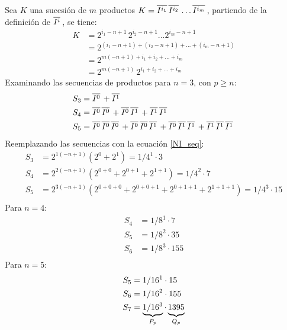 Sea $K$ una sucesión de $m$ productos $K = \overline{I^{i_1}}\, \overline{I^{i_2}}\, \ldots \overline{I^{i_m}}\,$, 
partiendo de la definición de $\overline{I^{i}}\,$, se tiene:
%
\begin{equation}
\label{NI_seq}
\begin{split}
	K &= 2^{i_1-n+1} \, 2^{i_2-n+1} \ldots 2^{i_m-n+1} \\
		&= 2^{(i_1-n+1) + (i_2-n+1) + \ldots + (i_m-n+1)} \\
		&= 2^{m(-n+1) + i_1 + i_2 + \ldots + i_m} \\
		& = 2^{m(-n+1)} \, 2^{i_1 + i_2 + \ldots + {i_m}}
\end{split}
\end{equation}
%
Examinando las secuencias de productos para $n = 3$, con $p \geq n$:
%
\begin{equation}
\begin{split}
	S_3 &= \overline{I^{0}}\, + \overline{I^{1}}\,\\
	S_4 &= \overline{I^{0}}\, \overline{I^{0}}\, + \overline{I^{0}}\, \overline{I^{1}}\, + \overline{I^{1}}\, \overline{I^{1}}\, \\
	S_5 &= \overline{I^{0}}\, \overline{I^{0}}\, \overline{I^{0}}\, + \overline{I^{0}}\, \overline{I^{0}}\, \overline{I^{1}}\,  + \overline{I^{0}}\, \overline{I^{1}}\, \overline{I^{1}}\, + \overline{I^{1}}\, \overline{I^{1}}\, \overline{I^{1}}\, \\
\end{split}
\end{equation}
%
Reemplazando las secuencias con la ecuación \eqref{NI_seq}:
%
\begin{equation}
\begin{split}
	S_3 &= 2^{1(-n+1)} (2^0+2^1) = 1/4^1 \cdot 3\\
	S_4 &= 2^{2(-n+1)} (2^{0+0} + 2^{0+1} + 2^{1+1}) = 1/4^2 \cdot 7\\
	S_5 &= 2^{3(-n+1)} (2^{0+0+0}+2^{0+0+1}+2^{0+1+1}+2^{1+1+1}) = 1/4^3 \cdot 
15\\
\end{split}
\end{equation}
%
Para $n = 4$:
%
\begin{equation}
\begin{split}
	S_4 &= 1/8^1 \cdot 7\\
	S_5 &= 1/8^2 \cdot 35\\
	S_6 &= 1/8^3 \cdot 155\\
\end{split}
\end{equation}
%
Para $n = 5$:
%
\begin{equation}
\begin{split}
	S_5 &= 1/16^1 \cdot 15 \\
	S_6 &= 1/16^2 \cdot 155 \\
	S_7 &= \underbrace{1/16^3}_{P_p} \cdot
		\underbrace{\vphantom{1/16^3}1395}_{Q_p} \\
\end{split}
\end{equation}
